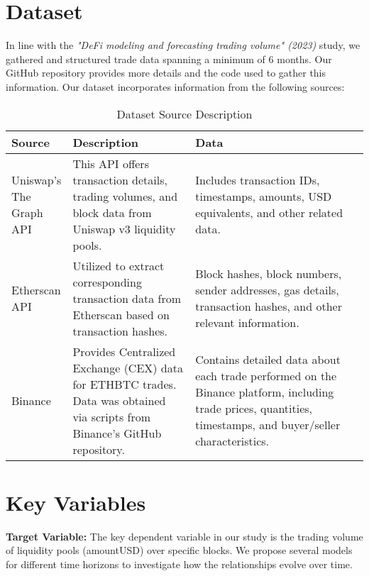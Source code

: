 \documentclass{article}
\begin{document}
\section*{\textbf{Dataset}}

In line with the \textit{"DeFi modeling and forecasting trading volume" (2023)} study\cite{defi-modeling-2023}, we gathered and structured trade data spanning a minimum of 6 months. Our GitHub repository provides more details and the code used to gather this information\cite{github-repo}. Our dataset incorporates information from the following sources:

\begin{table}[ht]
  \centering
  \small
  \begin{tabular}{|p{0.15\linewidth}|p{0.35\linewidth}|p{0.5\linewidth}|}
  \hline
  \textbf{Source} & \textbf{Description} & \textbf{Data} \\
  \hline
  Uniswap's The Graph API\cite{uniswap_graph_api} & This API offers transaction details, trading volumes, and block data from Uniswap v3 liquidity pools. & Includes transaction IDs, timestamps, amounts, USD equivalents, and other related data. \\
  \hline
  Etherscan API\cite{etherscan_api} & Utilized to extract corresponding transaction data from Etherscan based on transaction hashes. & Block hashes, block numbers, sender addresses, gas details, transaction hashes, and other relevant information. \\
  \hline
  Binance\cite{binance_cex_data} & Provides Centralized Exchange (CEX) data for ETHBTC trades. Data was obtained via scripts from Binance's GitHub repository. & Contains detailed data about each trade performed on the Binance platform, including trade prices, quantities, timestamps, and buyer/seller characteristics. \\
  \hline
  \end{tabular}
  \caption{Dataset Source Description}
  \label{tab:dataset-description}
  \end{table}


\section*{\textbf{Key Variables}}

\textbf{Target Variable:} The key dependent variable in our study is the trading volume of liquidity pools (amountUSD) over specific blocks. We propose several models for different time horizons to investigate how the relationships evolve over time.
\end{document}
